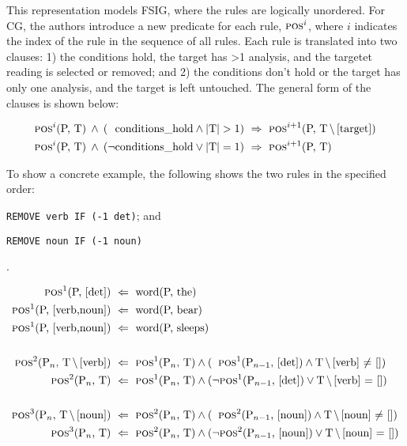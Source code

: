 This representation models FSIG, where the rules are logically
unordered. For CG, the authors introduce a new predicate for each rule,
$\text{{\sc pos}}^i$, where $i$ indicates the index of the rule in the
sequence of all rules.
Each rule is translated into two
clauses: 1) the conditions hold, the target has >1 analysis, and the 
targetet reading is selected or removed; and
2) the conditions don't hold or the target has only one analysis, and the target is left untouched. The general form of the clauses is shown below:

\begin{align*}
\text{{\sc pos}}^i\text{(P, T)} \: \wedge \: (\;\:\,  \text{conditions\_hold}
\wedge  \text{|T|} > 1) \  &\Rightarrow \  \text{{\sc pos}}^{i+1}\text{(P, T$\,\setminus\,$[target])} \\
\text{{\sc pos}}^i\text{(P, T)} \: \wedge \: (\neg \text{conditions\_hold} \vee
\text{|T|} = 1) \  &\Rightarrow \ \text{{\sc pos}}^{i+1}\text{(P, T)}
\end{align*}


To show a concrete example, the following shows the two rules in the specified order:
\begin{inparaenum}
\def\labelenumi{\arabic{enumi}.}
\itemsep1pt\parskip0pt
\item \texttt{REMOVE verb IF (-1 det)}; and
\item  \texttt{REMOVE noun IF (-1 noun)}
\end{inparaenum}.

\begin{align*}
\text{{\sc pos}$^1$(P, [det])} \  &\Leftarrow \  \text{word(P, the)} \\
\text{{\sc pos}$^1$(P, [verb,noun])} \ &\Leftarrow \ \text{word(P, bear)} \\
\text{{\sc pos}$^1$(P, [verb,noun])} \ &\Leftarrow \ \text{word(P, sleeps)} \\ \\
\text{{\sc pos}$^2$(P$_n$, T$\,\setminus\,$[verb])} \ &\Leftarrow \ \text{{\sc pos}$^1$(P$_n$, T)}
 \wedge (\;\; \text{{\sc pos}$^1$(P$_{n-1}$, [det])}  \wedge  \text{T$\,\setminus\,$[verb] $\neq$ []}) \\
\text{{\sc pos}$^2$(P$_n$, T)} \ &\Leftarrow \  \text{{\sc pos}$^1$(P$_n$, T)} \wedge
(\neg \text{{\sc pos}$^1$(P$_{n-1}$, [det])} \vee \text{T$\,\setminus\,$[verb]
  $=$ []}) \\ \\
\text{{\sc pos}$^3$(P$_n$, T$\,\setminus\,$[noun])} \ &\Leftarrow \ \text{{\sc pos}$^2$(P$_n$, T)}
 \wedge (\;\; \text{{\sc pos}$^2$(P$_{n-1}$, [noun])}  \wedge  \text{T$\,\setminus\,$[noun] $\neq$ []}) \\
\text{{\sc pos}$^3$(P$_n$, T)} \ &\Leftarrow \  \text{{\sc pos}$^2$(P$_n$, T)} \wedge
(\neg \text{{\sc pos}$^2$(P$_{n-1}$, [noun])} \vee \text{T$\,\setminus\,$[noun]
  $=$ []})
\end{align*}

